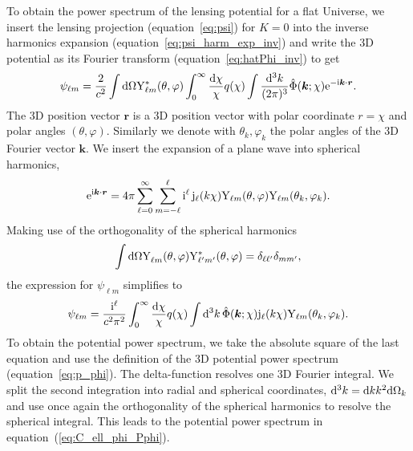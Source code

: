 \documentclass[fleqn,usenatbib]{mnras} %
\renewcommand{\vec}{\bm}
\begin{document}
\begin{appendix}
To obtain the power spectrum of the lensing potential for a flat Universe, 
we insert the lensing projection (equation~\ref{eq:psi}) for $K=0$ into the
inverse harmonics expansion (equation~\ref{eq:psi_harm_exp_inv}) and write the 3D potential
as its Fourier transform (equation~\ref{eq:hatPhi_inv}) to get
%
\begin{equation}
  \psi_{\ell m} = \frac 2 {c^2} \int {\rm d} \Omega {\rm Y}^\ast_{\ell m}(\theta, \varphi)
    \int_0^\infty \frac{{\rm d}\chi}{\chi} q(\chi) \int \frac{{\rm d}^3 k}{(2\pi)^3} \hat \Phi(\vec k; \chi) {\rm e}^{-{\rm i} \vec k \cdot \vec r}.
\end{equation}
%
The 3D position vector $\vec r$ is a 3D position vector with polar coordinate
$r = \chi$ and polar angles $(\theta, \varphi)$. Similarly we denote with
$\theta_k, \varphi_k$ the polar angles of the 3D Fourier vector $\vec k$. We
insert the expansion of a plane wave into spherical harmonics,
%
%
\begin{equation}
  {\rm e}^{{\rm i} \vec k \cdot \vec r} = 4 \pi \sum_{\ell=0}^{\infty} \sum_{m=-\ell}^{\ell}
    {\rm i}^\ell \, {\rm j}_\ell(k \chi)
    {\rm Y}_{\ell m}(\theta, \varphi) {\rm Y}_{\ell m}(\theta_k, \varphi_k) .
  \label{eq:wave_exp}
\end{equation}
%
Making use of the orthogonality of the spherical harmonics
%
%
\begin{equation}
  \int {\rm d} \Omega {\rm Y}^{}_{\ell m}(\theta, \varphi) {\rm Y}^\ast_{\ell^\prime m^\prime}(\theta, \varphi) = \delta_{\ell \ell^\prime} \delta_{m m^\prime},
  \label{eq:Yellm_ortho}
\end{equation}
%
the expression for $\psi_{\ell m}$ simplifies to
%
\begin{equation}
  \psi_{\ell m} = \frac {{\rm i}^\ell}{c^2 \pi^2} \int_0^\infty \frac{{\rm d}\chi}{\chi} q(\chi) \int {\rm d}^3 k \,
    \hat \Phi(\vec k; \chi) {\rm j}_\ell(k \chi) {\rm Y}_{\ell m}(\theta_k, \varphi_k).
  \label{eq:psi_ellm}
\end{equation}
%
To obtain the potential power spectrum, we take the absolute square of the
last equation and use the definition of the 3D potential power spectrum
(equation~\ref{eq:p_phi}). The delta-function resolves one 3D Fourier integral.
We split the second integration into radial and spherical coordinates, ${\rm
d}^3 k = {\rm d} k k^2 {\rm d} \Omega_k$ and use once again the orthogonality
of the spherical harmonics to resolve the spherical integral. This leads to the
potential power spectrum in equation~(\ref{eq:C_ell_phi_Pphi}).





\end{appendix}
\end{document}
